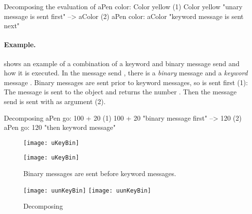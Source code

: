 \documentclass[a4paper,10pt,twoside]{book}
\begin{document}
\begin{example}[decColor]{Decomposing the evaluation of }{}
        aPen color: Color yellow
(1)                       Color yellow        "unary message is sent first"
                        --> aColor
(2)   aPen color: aColor                 "keyword message is sent next"
\end{example}

\paragraph{Example.}
 shows an example of a combination of a keyword and binary message send and how it is executed.
In the message send , there is a \emph{binary} message  and a \emph{keyword} message .
Binary messages are sent prior to keyword messages, so  is sent first (1):
The message  is sent to the object  and returns the number .
Then the message send  is sent with  as argument (2).

\begin{example}[decGo]{Decomposing }{}
      aPen go: 100 + 20   
(1)                 100 + 20           "binary message first"
                   -->   120
(2)  aPen go: 120                   "then keyword message"
\end{example}

\begin{figure}[htb]
\begin{minipage}[t]{0.48\textwidth}
	\ifluluelse
		{\centerline{\texttt{[image: uKeyBin]}}}
		{\centerline{\texttt{[image: uKeyBin]}}}
	\caption{Binary messages are sent before keyword messages.\label{fig:uKeyBin}}
\end{minipage}
\hfill
\begin{minipage}[t]{0.48\textwidth}
	\begin{center}
	\ifluluelse
		{\texttt{[image: uunKeyBin]}}
		{\texttt{[image: uunKeyBin]}}
\caption{Decomposing }\label{fig:unKeyBin}
\end{center}
\end{minipage}
\end{figure}

\end{document}
